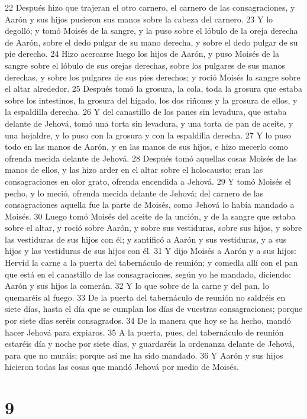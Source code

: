 22 Después hizo que trajeran el otro carnero, el carnero de las consagraciones, y Aarón y sus hijos pusieron sus manos sobre la cabeza del carnero.
23 Y lo degolló; y tomó Moisés de la sangre, y la puso sobre el lóbulo de la oreja derecha de Aarón, sobre el dedo pulgar de su mano derecha, y sobre el dedo pulgar de su pie derecho.
24 Hizo acercarse luego los hijos de Aarón, y puso Moisés de la sangre sobre el lóbulo de sus orejas derechas, sobre los pulgares de sus manos derechas, y sobre los pulgares de sus pies derechos; y roció Moisés la sangre sobre el altar alrededor.
25 Después tomó la grosura, la cola, toda la grosura que estaba sobre los intestinos, la grosura del hígado, los dos riñones y la grosura de ellos, y la espaldilla derecha.
26 Y del canastillo de los panes sin levadura, que estaba delante de Jehová, tomó una torta sin levadura, y una torta de pan de aceite, y una hojaldre, y lo puso con la grosura y con la espaldilla derecha.
27 Y lo puso todo en las manos de Aarón, y en las manos de sus hijos, e hizo mecerlo como ofrenda mecida delante de Jehová.
28 Después tomó aquellas cosas Moisés de las manos de ellos, y las hizo arder en el altar sobre el holocausto; eran las consagraciones en olor grato, ofrenda encendida a Jehová.
29 Y tomó Moisés el pecho, y lo meció, ofrenda mecida delante de Jehová; del carnero de las consagraciones aquella fue la parte de Moisés, como Jehová lo había mandado a Moisés.
30 Luego tomó Moisés del aceite de la unción, y de la sangre que estaba sobre el altar, y roció sobre Aarón, y sobre sus vestiduras, sobre sus hijos, y sobre las vestiduras de sus hijos con él; y santificó a Aarón y sus vestiduras, y a sus hijos y las vestiduras de sus hijos con él.
31 Y dijo Moisés a Aarón y a sus hijos: Hervid la carne a la puerta del tabernáculo de reunión; y comedla allí con el pan que está en el canastillo de las consagraciones, según yo he mandado, diciendo: Aarón y sus hijos la comerán.
32 Y lo que sobre de la carne y del pan, lo quemaréis al fuego.
33 De la puerta del tabernáculo de reunión no saldréis en siete días, hasta el día que se cumplan los días de vuestras consagraciones; porque por siete días seréis consagrados.
34 De la manera que hoy se ha hecho, mandó hacer Jehová para expiaros.
35 A la puerta, pues, del tabernáculo de reunión estaréis día y noche por siete días, y guardaréis la ordenanza delante de Jehová, para que no muráis; porque así me ha sido mandado.
36 Y Aarón y sus hijos hicieron todas las cosas que mandó Jehová por medio de Moisés.  

\chapter{9}

